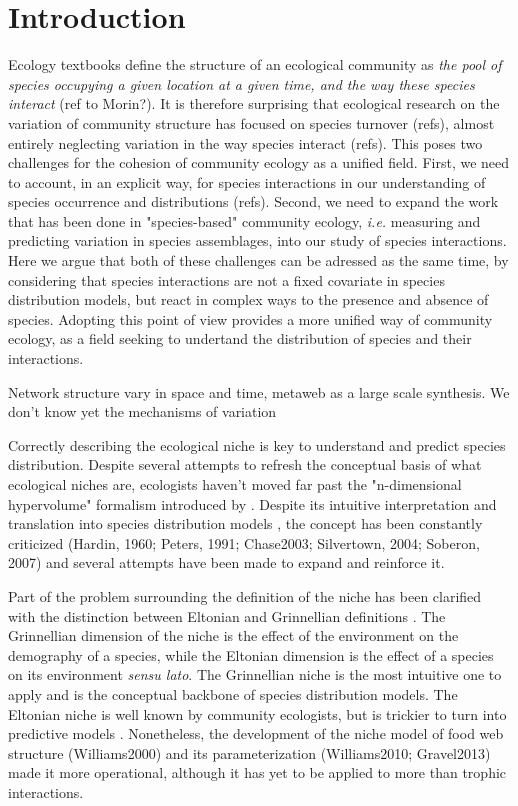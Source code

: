 \documentclass[12pt]{article}
\begin{document}
\section*{Introduction}

Ecology textbooks define the structure of an ecological community as \emph{the
pool of species occupying a given location at a given time, and the way
these species interact} (ref to Morin?). It is therefore surprising that
ecological research on the variation of community structure has focused
on species turnover (refs), almost entirely neglecting variation in the
way species interact (refs). This poses two challenges for the cohesion
of community ecology as a unified field. First, we need to account, in
an explicit way, for species interactions in our understanding of species
occurrence and distributions (refs). Second, we need to expand the work that
has been done in "species-based" community ecology, \emph{i.e.} measuring
and predicting variation in species assemblages, into our study of species
interactions. Here we argue that both of these challenges can be adressed
as the same time, by considering that species interactions are not a fixed
covariate in species distribution models, but react in complex ways to the
presence and absence of species. Adopting this point of view provides a
more unified way of community ecology, as a field seeking to undertand the
distribution of species and their interactions.

Network structure vary in space and time, metaweb as a large scale
synthesis. We don't know yet the mechanisms of variation


Correctly describing the ecological niche is key to understand and predict
species distribution. Despite several attempts to refresh the conceptual
basis of what ecological niches are, ecologists haven't moved far past the
"n-dimensional hypervolume" formalism \parencite{Holt2009} introduced by
\textcite{Hutchinson1961}. Despite its intuitive interpretation and translation
into species distribution models \parencite{Blonder2014}, the concept has been
constantly criticized (Hardin, 1960; Peters, 1991; Chase2003; Silvertown, 2004;
Soberon, 2007) and several attempts have been made to expand and reinforce it.

Part of the problem surrounding the definition of the niche has been
clarified with the distinction between Eltonian and Grinnellian definitions
\parencite{Chase2003}. The Grinnellian dimension of the niche is the
effect of the environment on the demography of a species, while the Eltonian
dimension is the effect of a species on its environment \emph{sensu lato}. The
Grinnellian niche is the most intuitive one to apply and is the conceptual
backbone of species distribution models. The Eltonian niche is well known
by community ecologists, but is trickier to turn into predictive models
\parencite{Devictor2010a}. Nonetheless, the development of the niche model
of food web structure (Williams2000) and its parameterization (Williams2010;
Gravel2013) made it more operational, although it has yet to be applied to
more than trophic interactions.
\end{document}
